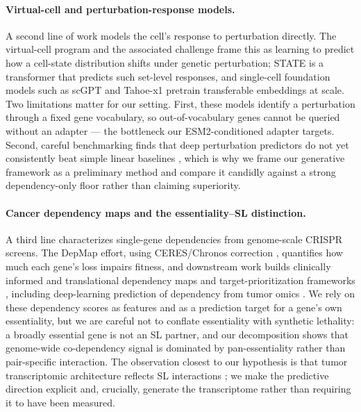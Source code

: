 \paragraph{Virtual-cell and perturbation-response models.}
A second line of work models the cell's response to perturbation directly. The
virtual-cell program \citep{bunne2024virtualcell} and the associated challenge
\citep{roohani2025virtualcellchallenge} frame this as learning to predict how a
cell-state distribution shifts under genetic perturbation; STATE
\citep{adduri2025state} is a transformer that predicts such set-level responses,
and single-cell foundation models such as scGPT \citep{cui2024scgpt} and
Tahoe-x1 \citep{gandhi2025tahoex1} pretrain transferable embeddings at scale.
Two limitations matter for our setting. First, these models identify a
perturbation through a fixed gene vocabulary, so out-of-vocabulary genes cannot
be queried without an adapter --- the bottleneck our ESM2-conditioned adapter
\citep{lin2023esm2} targets. Second, careful benchmarking finds that deep
perturbation predictors do not yet consistently beat simple linear baselines
\citep{ahlmanneltze2025linear, vinastorne2025systema}, which is why we frame our
generative framework as a preliminary method and compare it candidly against a
strong dependency-only floor rather than claiming superiority.

\paragraph{Cancer dependency maps and the essentiality--SL distinction.}
A third line characterizes single-gene dependencies from genome-scale CRISPR
screens. The DepMap effort, using CERES/Chronos correction
\citep{meyers2017ceres}, quantifies how much each gene's loss impairs fitness,
and downstream work builds clinically informed and translational dependency maps
and target-prioritization frameworks \citep{pacini2024depmap, shi2024translational},
including deep-learning prediction of dependency from tumor omics
\citep{chiu2021deepdep}. We rely on these dependency scores as features and as a
prediction target for a gene's own essentiality, but we are careful not to
conflate essentiality with synthetic lethality: a broadly essential gene is not
an SL partner, and our decomposition shows that genome-wide co-dependency signal
is dominated by pan-essentiality rather than pair-specific interaction. The
observation closest to our hypothesis is that tumor transcriptomic architecture
reflects SL interactions \citep{haider2025transcriptomic}; we make the predictive
direction explicit and, crucially, generate the transcriptome rather than
requiring it to have been measured.
